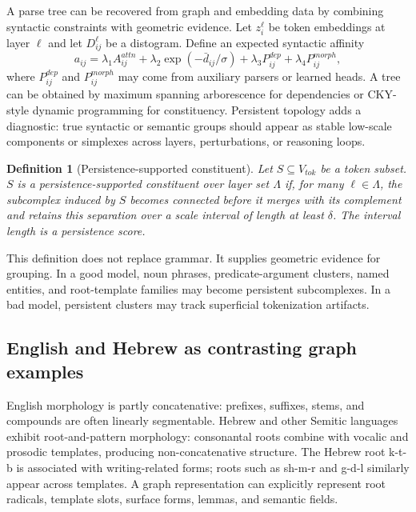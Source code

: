 \documentclass[11pt]{article}
\newtheorem{definition}{Definition}[section]
\newcommand{\1}{\mathbf{1}}
\begin{document}
A parse tree can be recovered from graph and embedding data by combining syntactic constraints with geometric evidence. Let $z_i^\ell$ be token embeddings at layer $\ell$ and let $D_{ij}^\ell$ be a distogram. Define an expected syntactic affinity
\[
a_{ij}=\lambda_1 A_{ij}^{attn}+\lambda_2 \exp(-\bar d_{ij}/\sigma)+\lambda_3 P_{ij}^{dep}+\lambda_4 P_{ij}^{morph},
\]
where $P_{ij}^{dep}$ and $P_{ij}^{morph}$ may come from auxiliary parsers or learned heads. A tree can be obtained by maximum spanning arborescence for dependencies or CKY-style dynamic programming for constituency. Persistent topology adds a diagnostic: true syntactic or semantic groups should appear as stable low-scale components or simplexes across layers, perturbations, or reasoning loops.

\begin{definition}[Persistence-supported constituent]
Let $S\subseteq V_{tok}$ be a token subset. $S$ is a persistence-supported constituent over layer set $\Lambda$ if, for many $\ell\in\Lambda$, the subcomplex induced by $S$ becomes connected before it merges with its complement and retains this separation over a scale interval of length at least $\delta$. The interval length is a persistence score.
\end{definition}

This definition does not replace grammar. It supplies geometric evidence for grouping. In a good model, noun phrases, predicate-argument clusters, named entities, and root-template families may become persistent subcomplexes. In a bad model, persistent clusters may track superficial tokenization artifacts.

\subsection{English and Hebrew as contrasting graph examples}

English morphology is partly concatenative: prefixes, suffixes, stems, and compounds are often linearly segmentable. Hebrew and other Semitic languages exhibit root-and-pattern morphology: consonantal roots combine with vocalic and prosodic templates, producing non-concatenative structure. The Hebrew root k-t-b is associated with writing-related forms; roots such as sh-m-r and g-d-l similarly appear across templates. A graph representation can explicitly represent root radicals, template slots, surface forms, lemmas, and semantic fields.
\end{document}
